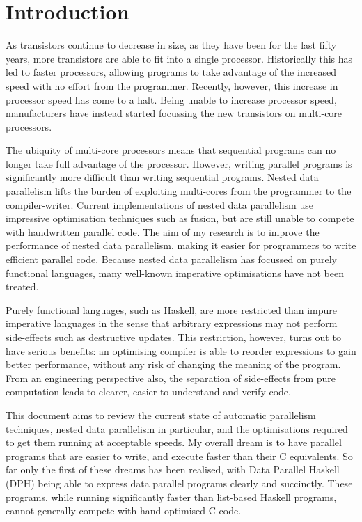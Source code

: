 
\section{Introduction}
As transistors continue to decrease in size, as they have been for the last fifty years, more transistors are able to fit into a single processor.
Historically this has led to faster processors, allowing programs to take advantage of the increased speed with no effort from the programmer.
Recently, however, this increase in processor speed has come to a halt.
Being unable to increase processor speed, manufacturers have instead started focussing the new transistors on multi-core processors.

The ubiquity of multi-core processors means that sequential programs can no longer take full advantage of the processor.
However, writing parallel programs is significantly more difficult than writing sequential programs.
Nested data parallelism lifts the burden of exploiting multi-cores from the programmer to the compiler-writer.
Current implementations of nested data parallelism use impressive optimisation techniques such as fusion, but are still unable to compete with handwritten parallel code.
The aim of my research is to improve the performance of nested data parallelism, making it easier for programmers to write efficient parallel code.
Because nested data parallelism has focussed on purely functional languages, many well-known imperative optimisations have not been treated.

Purely functional languages, such as Haskell, are more restricted than impure imperative languages
in the sense that arbitrary expressions may not perform side-effects such as destructive updates.
This restriction, however, turns out to have serious benefits:
an optimising compiler is able to reorder expressions to gain better performance,
without any risk of changing the meaning of the program.
From an engineering perspective also, the separation of side-effects from pure computation leads to clearer, easier to understand and verify code.

This document aims to review the current state of automatic parallelism techniques, nested data parallelism in particular,
and the optimisations required to get them running at acceptable speeds.
My overall dream is to have parallel programs that are easier to write, and execute faster than their C equivalents.
So far only the first of these dreams has been realised, with Data Parallel Haskell (DPH)
being able to express data parallel programs clearly and succinctly.
These programs, while running significantly faster than list-based Haskell programs, cannot generally compete with hand-optimised C code.
